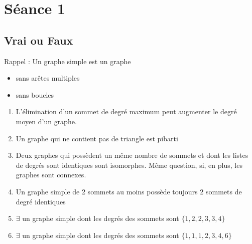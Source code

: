 \section{Séance 1}


\subsection{Vrai ou Faux}
Rappel : Un graphe simple est un graphe
\begin{itemize}
  \item sans arêtes multiples
  \item sans boucles
\end{itemize}
\begin{enumerate}
  \item{L'élimination d'un sommet de degré maximum peut augmenter le degré moyen d'un graphe.}
  \item{Un graphe qui ne contient pas de triangle est pibarti}
  \item{Deux graphes qui possèdent un même nombre de sommets et dont les listes de degrés sont identiques sont isomorphes. Même question, si, en plus, les graphes sont connexes.}
  \item{Un graphe simple de 2 sommets au moins possède toujours 2 sommets de degré identiques}
  \item{$\exists$ un graphe simple dont les degrés des sommets sont $\{1,2,2,3,3,4\}$}
  \item{$\exists$ un graphe simple dont les degrés des sommets sont $\{1,1,1,2,3,4,6\}$}
\end{enumerate}

